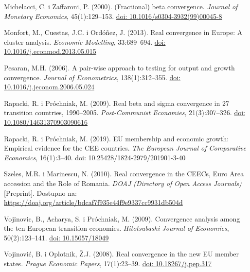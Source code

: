 \documentclass{crebsshr}
\begin{document}
\begin{thebibliography}{99}
Michelacci, C. i Zaffaroni, P. (2000). (Fractional) beta convergence.
\emph{Journal of Monetary Economics}, 45(1):129--153.
\href{https://doi.org/10.1016/s0304-3932(99)00045-8}{doi: 10.1016/s0304-3932(99)00045-8}

Monfort, M., Cuestas, J.C. i Ordóñez, J. (2013). Real convergence in Europe:
A cluster analysis.
\emph{Economic Modelling}, 33:689--694.
\href{https://doi.org/10.1016/j.econmod.2013.05.015}{doi: 10.1016/j.econmod.2013.05.015}

Pesaran, M.H. (2006). A pair-wise approach to testing for output and growth convergence.
\emph{Journal of Econometrics}, 138(1):312--355.
\href{https://doi.org/10.1016/j.jeconom.2006.05.024}{doi: 10.1016/j.jeconom.2006.05.024}

Rapacki, R. i Próchniak, M. (2009). Real beta and sigma convergence in 27 transition countries,
1990--2005.
\emph{Post-Communist Economies}, 21(3):307--326.
\href{https://doi.org/10.1080/14631370903090616}{doi: 10.1080/14631370903090616}

Rapacki, R. i Próchniak, M. (2019). EU membership and economic growth:
Empirical evidence for the CEE countries.
\emph{The European Journal of Comparative Economics}, 16(1):3--40.
\href{https://doi.org/10.25428/1824-2979/201901-3-40}{doi: 10.25428/1824-2979/201901-3-40}

Szeles, M.R. i Marinescu, N. (2010). Real convergence in the CEECs,
Euro Area accession and the Role of Romania.
\emph{DOAJ (Directory of Open Access Journals)} [Preprint].
Dostupno na: \url{https://doaj.org/article/bdcaf7f935e44f9e9337cc9931db504d}

Vojinovic, B., Acharya, S. i Próchniak, M. (2009). Convergence analysis among the
ten European transition economies.
\emph{Hitotsubashi Journal of Economics}, 50(2):123--141.
\href{https://doi.org/10.15057/18049}{doi: 10.15057/18049}

Vojinović, B. i Oplotnik, Ž.J. (2008). Real convergence in the new EU member states.
\emph{Prague Economic Papers}, 17(1):23--39.
\href{https://doi.org/10.18267/j.pep.317}{doi: 10.18267/j.pep.317}

\end{thebibliography}
\end{document}
